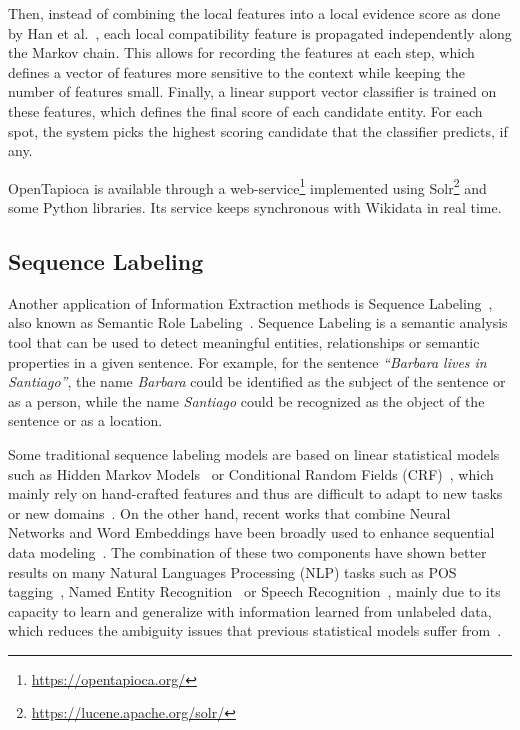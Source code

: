 Then, instead of combining the local features into a local evidence score as done by 
Han et al.~\cite{infExtr:HanSZ11}, each local compatibility feature is propagated 
independently along the Markov chain. This allows for recording the features at each step, 
which defines a vector of features more sensitive to the context while keeping the number of 
features small. Finally, a linear support vector classifier is trained on these features, 
which defines the final score of each candidate entity. For each spot, the system picks the 
highest scoring candidate that the classifier predicts, if any.

OpenTapioca is available through a web-service\footnote{\url{https://opentapioca.org/}} 
implemented using Solr\footnote{\url{https://lucene.apache.org/solr/}} and some Python libraries. 
Its service keeps synchronous with Wikidata in real time.

\subsection{Sequence Labeling}
\label{cap3:infExtr/sequenceLabeling}
Another application of Information Extraction methods is Sequence Labeling~\cite{seqlab:Graves2012-385, seqlab:MaH16}, 
also known as Semantic Role Labeling~\cite{seqlab:GildeaJ02}. Sequence Labeling is a 
semantic analysis tool that can be used to detect meaningful entities, relationships or 
semantic properties in a given sentence. For example, for the sentence \textit{“Barbara lives 
in Santiago”}, the name \textit{Barbara} could be identified as the subject of the sentence 
or as a person, while the name \textit{Santiago} could be recognized as the object of the 
sentence or as a location.

Some traditional sequence labeling models are based on linear statistical models such as 
Hidden Markov Models~\cite{seqlab:RatinovR09} or Conditional Random 
Fields (CRF)~\cite{seqlab:PassosKM14, seqlab:LuoHLN15}, which mainly rely on hand-crafted 
features and thus are difficult to adapt to new tasks or new domains~\cite{seqlab:MaX14}. 
On the other hand, recent works that combine Neural Networks and Word Embeddings have been 
broadly used to enhance sequential data modeling~\cite{seqlab:ChoMBB14, seqlab:GersSC00}. 
The combination of these two components have shown better results on many Natural 
Languages Processing (NLP) tasks such as POS tagging~\cite{seqlab:MaH16,seqlab:HuangXY15}, 
Named Entity Recognition~\cite{seqlab:ChiuN15,seqlab:HuMLHX16} or Speech 
Recognition~\cite{seqlab:GravesMH13}, mainly due to its capacity to learn and generalize 
with information learned from unlabeled data, which reduces the ambiguity issues that 
previous statistical models suffer from~\cite{seqlab:MaX14}.

